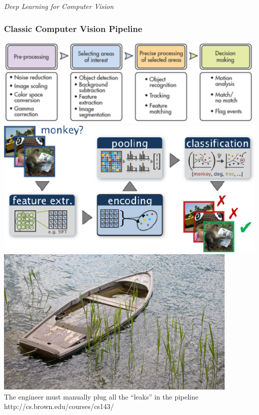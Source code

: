 \documentclass{beamer}
\begin{document}
\begin{frame}
\begin{center} 
\huge \color{blue} \emph{Deep Learning for Computer Vision}
\end{center} 
\end{frame} 

\begin{frame}
\frametitle{Classic Computer Vision Pipeline}
\begin{center} 
\includegraphics[scale=0.31]{./Figures/old_pipeline.pdf} \\ \vspace{0.5cm} 
\includegraphics[scale=0.6]{./Figures/detection.pdf} \hspace{1.5cm} 
\includegraphics[scale=0.5]{./Figures/boat.jpg}\\
The engineer must manually plug all the ``leaks'' in the pipeline \\ \vspace{0.5cm} 
\tiny{http://cs.brown.edu/courses/cs143/}
\end{center} 
\end{frame} 
\end{document}
